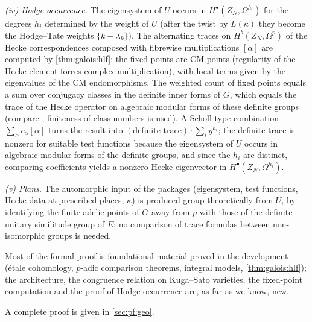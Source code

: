 \begin{proofoutline}
\emph{(iv) Hodge occurrence.} The eigensystem of $U$ occurs in $H^\bullet(Z_N,\Omega^{h_i})$ for the
degrees $h_i$ determined by the weight of $U$ (after the twist by $L(\kappa)$ they become the
Hodge--Tate weights $\{k-\lambda_k\}$). The alternating traces on $H^b(Z_N,\Omega^p)$ of the Hecke
correspondences composed with fibrewise multiplications $[\alpha]$ are computed by
\cref{thm:galois:hlf}: the fixed points are CM points (regularity of the Hecke element forces complex
multiplication), with local terms given by the eigenvalues of the CM endomorphisms. The weighted count
of fixed points equals a sum over conjugacy classes in the definite inner forms of $G$, which equals
the trace of the Hecke operator on algebraic modular forms \cite{Gross1999} of these definite groups
(compare \cite{Kottwitz1992}; finiteness of class numbers \cite{Borel1963} is used). A Scholl-type combination $\sum_\alpha c_\alpha[\alpha]$
turns the result into $(\text{definite trace})\cdot\sum_iy^{h_i}$; the definite trace is nonzero for
suitable test functions because the eigensystem of $U$ occurs in algebraic modular forms of the
definite groups, and since the $h_i$ are distinct, comparing coefficients yields a nonzero Hecke
eigenvector in $H^\bullet(Z_N,\Omega^{h_i})$.

\emph{(v) Plans.} The automorphic input of the packages (eigensystem, test functions, Hecke data at
prescribed places, $\kappa$) is produced group-theoretically from $U$, by identifying the finite adelic
points of $G$ away from $p$ with those of the definite unitary similitude group of $E$; no comparison
of trace formulas between non-isomorphic groups is needed.

Most of the formal proof is foundational material proved in the development (\'etale cohomology,
$p$-adic comparison theorems, integral models, \cref{thm:galois:hlf}); the architecture, the
congruence relation on Kuga--Sato varieties, the fixed-point computation and the proof of Hodge
occurrence are, as far as we know, new.

A complete proof is given in \cref{sec:pf:geo}.
\end{proofoutline}
